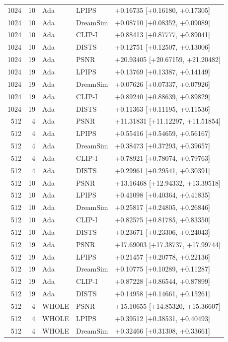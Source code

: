 \documentclass[10pt,letterpaper]{article}
\begin{document}
\begin{longtable}{@{}rrlll@{}}
1024 & 10 & Ada & LPIPS & +0.16735 [+0.16180, +0.17305]\\
1024 & 10 & Ada & DreamSim & +0.08710 [+0.08352, +0.09089]\\
1024 & 10 & Ada & CLIP-I & +0.88413 [+0.87777, +0.89041]\\
1024 & 10 & Ada & DISTS & +0.12751 [+0.12507, +0.13006]\\
1024 & 19 & Ada & PSNR & +20.93405 [+20.67159, +21.20482]\\
1024 & 19 & Ada & LPIPS & +0.13769 [+0.13387, +0.14149]\\
1024 & 19 & Ada & DreamSim & +0.07626 [+0.07337, +0.07926]\\
1024 & 19 & Ada & CLIP-I & +0.89240 [+0.88639, +0.89829]\\
1024 & 19 & Ada & DISTS & +0.11363 [+0.11195, +0.11536]\\
512 & 4 & Ada & PSNR & +11.31831 [+11.12297, +11.51854]\\
512 & 4 & Ada & LPIPS & +0.55416 [+0.54659, +0.56167]\\
512 & 4 & Ada & DreamSim & +0.38473 [+0.37293, +0.39657]\\
512 & 4 & Ada & CLIP-I & +0.78921 [+0.78074, +0.79763]\\
512 & 4 & Ada & DISTS & +0.29961 [+0.29541, +0.30391]\\
512 & 10 & Ada & PSNR & +13.16468 [+12.94332, +13.39518]\\
512 & 10 & Ada & LPIPS & +0.41098 [+0.40364, +0.41835]\\
512 & 10 & Ada & DreamSim & +0.25817 [+0.24805, +0.26846]\\
512 & 10 & Ada & CLIP-I & +0.82575 [+0.81785, +0.83350]\\
512 & 10 & Ada & DISTS & +0.23671 [+0.23306, +0.24043]\\
512 & 19 & Ada & PSNR & +17.69003 [+17.38737, +17.99744]\\
512 & 19 & Ada & LPIPS & +0.21457 [+0.20778, +0.22136]\\
512 & 19 & Ada & DreamSim & +0.10775 [+0.10289, +0.11287]\\
512 & 19 & Ada & CLIP-I & +0.87228 [+0.86544, +0.87899]\\
512 & 19 & Ada & DISTS & +0.14958 [+0.14661, +0.15261]\\
512 & 4 & WHOLE & PSNR & +15.10655 [+14.85320, +15.36607]\\
512 & 4 & WHOLE & LPIPS & +0.39512 [+0.38531, +0.40493]\\
512 & 4 & WHOLE & DreamSim & +0.32466 [+0.31308, +0.33661]\\

\end{longtable}
\end{document}
